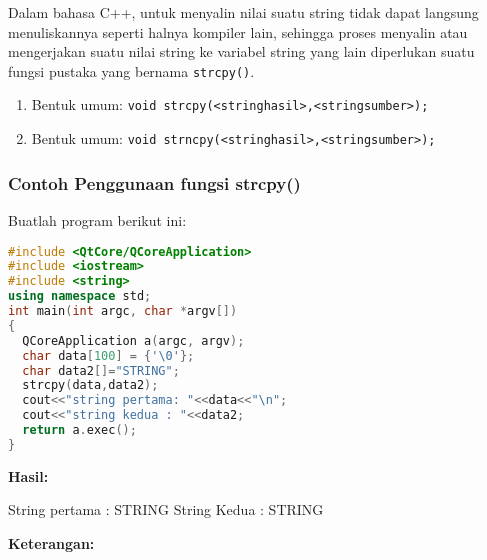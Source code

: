 Dalam bahasa C++, untuk menyalin nilai suatu string tidak dapat langsung
menuliskannya seperti halnya kompiler lain, sehingga proses menyalin
atau mengerjakan suatu nilai string ke variabel string yang lain
diperlukan suatu fungsi pustaka yang bernama \texttt{strcpy()}.

\begin{enumerate}

\item
  Bentuk umum:
  \texttt{void\ strcpy(\textless{}stringhasil\textgreater{},\textless{}stringsumber\textgreater{});}
\item
  Bentuk umum:
  \texttt{void\ strncpy(\textless{}stringhasil\textgreater{},\textless{}stringsumber\textgreater{});}
\end{enumerate}

\subsubsection*{Contoh  Penggunaan fungsi strcpy()}

Buatlah program berikut ini:

\begin{lstlisting}[language=c++, caption=Penggunaan fungsi strcpy(), label=contoh3-20]
#include <QtCore/QCoreApplication>
#include <iostream>
#include <string>
using namespace std;
int main(int argc, char *argv[])
{
  QCoreApplication a(argc, argv);
  char data[100] = {'\0'};
  char data2[]="STRING";
  strcpy(data,data2);
  cout<<"string pertama: "<<data<<"\n";
  cout<<"string kedua : "<<data2;
  return a.exec();
}
\end{lstlisting}

\textbf{Hasil:}
\begin{lcverbatim}
String pertama : STRING
String Kedua : STRING
\end{lcverbatim}


\textbf{Keterangan:}

